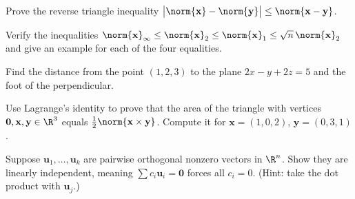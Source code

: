 \begin{exercise}
Prove the reverse triangle inequality $\big\lvert\norm{\mathbf{x}}-\norm{\mathbf{y}}\big\rvert\le\norm{\mathbf{x}-\mathbf{y}}$.
\end{exercise}

\begin{exercise}
Verify the inequalities $\norm{\mathbf{x}}_\infty\le\norm{\mathbf{x}}_2\le\norm{\mathbf{x}}_1\le\sqrt n\,\norm{\mathbf{x}}_2$ and give an example for each of the four equalities.
\end{exercise}

\begin{exercise}
Find the distance from the point $(1,2,3)$ to the plane $2x-y+2z=5$ and the foot of the perpendicular.
\end{exercise}

\begin{exercise}
Use Lagrange's identity to prove that the area of the triangle with vertices $\mathbf{0},\mathbf{x},\mathbf{y}\in\R^3$ equals $\tfrac12\norm{\mathbf{x}\times\mathbf{y}}$. Compute it for $\mathbf{x}=(1,0,2)$, $\mathbf{y}=(0,3,1)$.
\end{exercise}

\begin{exercise}
Suppose $\mathbf{u}_1,\dots,\mathbf{u}_k$ are pairwise orthogonal nonzero vectors in $\R^n$. Show they are linearly independent, meaning $\sum c_i\mathbf{u}_i=\mathbf{0}$ forces all $c_i=0$. (Hint: take the dot product with $\mathbf{u}_j$.)
\end{exercise}
